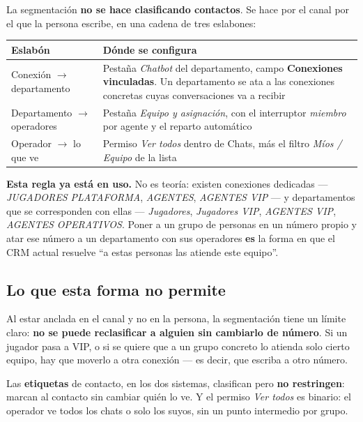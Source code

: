 \documentclass[11pt,a4paper]{article}
\begin{document}
La segmentación \textbf{no se hace clasificando contactos}. Se hace por el canal por el
que la persona escribe, en una cadena de tres eslabones:

\begin{center}
\begin{tabularx}{\textwidth}{@{}lL@{}}
\toprule
\textbf{Eslabón} & \textbf{Dónde se configura} \\
\midrule
Conexión $\rightarrow$ departamento & Pestaña \emph{Chatbot} del departamento, campo
  \textbf{Conexiones vinculadas}. Un departamento se ata a las conexiones concretas cuyas
  conversaciones va a recibir \\
Departamento $\rightarrow$ operadores & Pestaña \emph{Equipo y asignación}, con el
  interruptor \emph{miembro} por agente y el reparto automático \\
Operador $\rightarrow$ lo que ve & Permiso \emph{Ver todos} dentro de Chats, más el
  filtro \emph{Míos / Equipo} de la lista \\
\bottomrule
\end{tabularx}
\end{center}

\begin{nota}
\textbf{Esta regla ya está en uso.} No es teoría: existen conexiones dedicadas
--- \emph{JUGADORES PLATAFORMA}, \emph{AGENTES}, \emph{AGENTES VIP} --- y departamentos
que se corresponden con ellas --- \emph{Jugadores}, \emph{Jugadores VIP},
\emph{AGENTES VIP}, \emph{AGENTES OPERATIVOS}. Poner a un grupo de personas en un número
propio y atar ese número a un departamento con sus operadores \textbf{es} la forma en que
el CRM actual resuelve ``a estas personas las atiende este equipo''.
\end{nota}

\subsection{Lo que esta forma no permite}

Al estar anclada en el canal y no en la persona, la segmentación tiene un límite claro:
\textbf{no se puede reclasificar a alguien sin cambiarlo de número}. Si un jugador pasa a
VIP, o si se quiere que a un grupo concreto lo atienda solo cierto equipo, hay que moverlo
a otra conexión --- es decir, que escriba a otro número.

Las \textbf{etiquetas} de contacto, en los dos sistemas, clasifican pero \textbf{no
restringen}: marcan al contacto sin cambiar quién lo ve. Y el permiso \emph{Ver todos} es
binario: el operador ve todos los chats o solo los suyos, sin un punto intermedio por
grupo.
\end{document}
